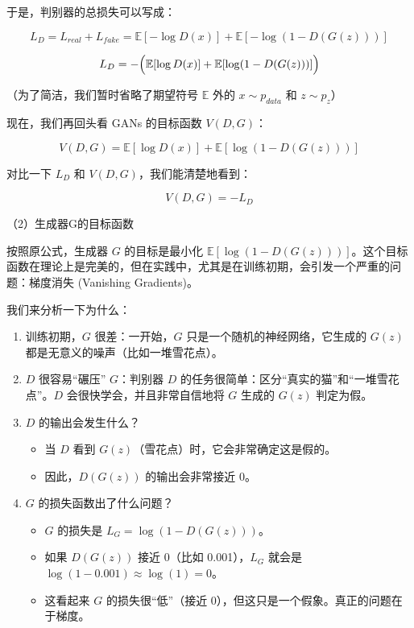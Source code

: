 于是，判别器的总损失可以写成：

\[
L_D = L_{real} + L_{fake} = \mathbb{E}[-\log D(x)] + \mathbb{E}[-\log(1-D(G(z)))]
\]

\[
L_D = -\Bigl(\mathbb{E}[\log D(x)] + \mathbb{E}[\log(1-D(G(z)))]\Bigr)
\]

（为了简洁，我们暂时省略了期望符号 \(\mathbb{E}\) 外的 \(x\sim p_{data}\) 和 \(z\sim p_z\)）

现在，我们再回头看 GANs 的目标函数 \(V(D,G)\)：

\[
V(D,G)=\mathbb{E}[\log D(x)] + \mathbb{E}[\log(1-D(G(z)))]
\]

对比一下 \(L_D\) 和 \(V(D,G)\)，我们能清楚地看到：

\[
V(D,G) = -L_D
\]

（2）生成器G的目标函数

按照原公式，生成器 \(G\) 的目标是最小化 \(\mathbb{E}[\log(1-D(G(z)))]\)。这个目标函数在理论上是完美的，但在实践中，尤其是在训练初期，会引发一个严重的问题：梯度消失 (Vanishing Gradients)。

我们来分析一下为什么：

\begin{enumerate}
\def\labelenumi{\arabic{enumi}.}
\tightlist
\item
  训练初期，\(G\) 很差：一开始，\(G\) 只是一个随机的神经网络，它生成的 \(G(z)\) 都是无意义的噪声（比如一堆雪花点）。
\item
  \(D\) 很容易``碾压'' \(G\)：判别器 \(D\) 的任务很简单：区分``真实的猫''和``一堆雪花点''。\(D\) 会很快学会，并且非常自信地将 \(G\) 生成的 \(G(z)\) 判定为假。
\item
  \(D\) 的输出会发生什么？

  \begin{itemize}
  \tightlist
  \item
    当 \(D\) 看到 \(G(z)\)（雪花点）时，它会非常确定这是假的。
  \item
    因此，\(D(G(z))\) 的输出会非常接近 0。
  \end{itemize}
\item
  \(G\) 的损失函数出了什么问题？

  \begin{itemize}
  \tightlist
  \item
    \(G\) 的损失是 \(L_G=\log(1-D(G(z)))\)。
  \item
    如果 \(D(G(z))\) 接近 0（比如 0.001），\(L_G\) 就会是 \(\log(1-0.001)\approx \log(1)=0\)。
  \item
    这看起来 \(G\) 的损失很``低''（接近 0），但这只是一个假象。真正的问题在于梯度。
  \end{itemize}
\end{enumerate}

